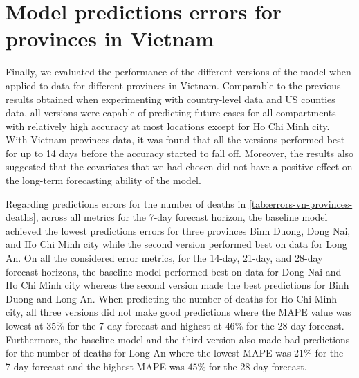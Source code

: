 \section{Model predictions errors for provinces in Vietnam}

Finally, we evaluated the performance of the different versions of the model when applied to data for different provinces in Vietnam.
Comparable to the previous results obtained when experimenting with country-level data and \gls{US} counties data, all versions were capable of predicting future cases for all compartments with relatively high accuracy at most locations except for Ho Chi Minh city.
With Vietnam provinces data, it was found that all the versions performed best for up to 14 days before the accuracy started to fall off.
Moreover, the results also suggested that the covariates that we had chosen did not have a positive effect on the long-term forecasting ability of the model.

Regarding predictions errors for the number of deaths in \autoref{tab:errors-vn-provinces-deaths}, across all metrics for the 7-day forecast horizon, the baseline model achieved the lowest predictions errors for three provinces Binh Duong, Dong Nai, and Ho Chi Minh city while the second version performed best on data for Long An.
On all the considered error metrics, for the 14-day, 21-day, and 28-day forecast horizons, the baseline model performed best on data for Dong Nai and Ho Chi Minh city whereas the second version made the best predictions for Binh Duong and Long An.
When predicting the number of deaths for Ho Chi Minh city, all three versions did not make good predictions where the \gls{MAPE} value was lowest at $35$\% for the 7-day forecast and highest at $46$\% for the 28-day forecast.
Furthermore, the baseline model and the third version also made bad predictions for the number of deaths for Long An where the lowest \gls{MAPE} was $21$\% for the 7-day forecast and the highest \gls{MAPE} was $45$\% for the 28-day forecast.

